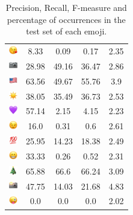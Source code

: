 \documentclass{article}
\begin{document}
\begin{table}
\begin{tabular}{|c|ccc|c|}
\includegraphics[height=0.37cm,width=0.37cm]{img/face_blowing_a_kiss.png} & 8.33 & 0.09 & 0.17 & 2.35\\ 
\includegraphics[height=0.37cm,width=0.37cm]{img/camera.png} & 28.98 & 49.16 & 36.47 & 2.86\\ 
\includegraphics[height=0.37cm,width=0.37cm]{img/United_States.png} & 63.56 & 49.67 & 55.76 & 3.9\\ 
\includegraphics[height=0.37cm,width=0.37cm]{img/sun.png} & 38.05 & 35.49 & 36.73 & 2.53\\ 
\includegraphics[height=0.37cm,width=0.37cm]{img/purple_heart.png} & 57.14 & 2.15 & 4.15 & 2.23\\ 
\includegraphics[height=0.37cm,width=0.37cm]{img/winking_face.png} & 16.0 & 0.31 & 0.6 & 2.61\\ 
\includegraphics[height=0.37cm,width=0.37cm]{img/hundred_points.png} & 25.95 & 14.23 & 18.38 & 2.49\\ 
\includegraphics[height=0.37cm,width=0.37cm]{img/beaming_face_with_smiling_eyes.png} & 33.33 & 0.26 & 0.52 & 2.31\\ 
\includegraphics[height=0.37cm,width=0.37cm]{img/Christmas_tree.png} & 65.88 & 66.6 & 66.24 & 3.09\\ 
\includegraphics[height=0.37cm,width=0.37cm]{img/camera_with_flash.png} & 47.75 & 14.03 & 21.68 & 4.83\\ 
\includegraphics[height=0.37cm,width=0.37cm]{img/winking_face_with_tongue.png} & 0.0 & 0.0 & 0.0 & 2.02\\ 

\hline
\end{tabular}
\caption{\label{table:emoji_detailed} Precision, Recall, F-measure and percentage of occurrences in the test set of each emoji.}
\end{table}
\end{document}
